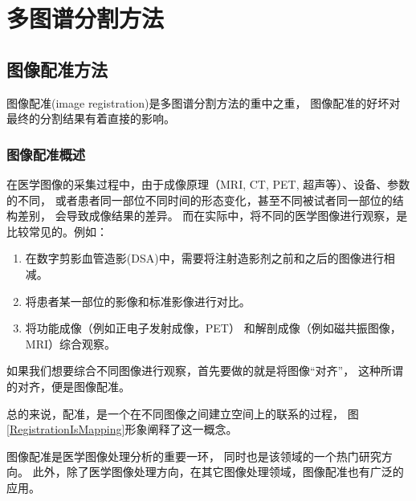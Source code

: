 
\chapter{多图谱分割方法}

\section{图像配准方法}
  图像配准(image registration)是多图谱分割方法的重中之重，
  图像配准的好坏对最终的分割结果有着直接的影响。
\subsection{图像配准概述}
在医学图像的采集过程中，由于成像原理（MRI, CT, PET, 超声等）、设备、参数的不同，
或者患者同一部位不同时间的形态变化，甚至不同被试者同一部位的结构差别，
会导致成像结果的差异。
而在实际中，将不同的医学图像进行观察，是比较常见的。例如：
\begin{enumerate}
  \item 在数字剪影血管造影(DSA)中，需要将注射造影剂之前和之后的图像进行相减。
  \item 将患者某一部位的影像和标准影像进行对比。
  \item 将功能成像（例如正电子发射成像，PET）%
    和解剖成像（例如磁共振图像，MRI）综合观察。
\end{enumerate}
如果我们想要综合不同图像进行观察，首先要做的就是将图像``对齐''，
这种所谓的对齐，便是图像配准。

总的来说，配准，是一个在不同图像之间建立空间上的联系的过程，
图\ref{RegistrationIsMapping}形象阐释了这一概念。

图像配准是医学图像处理分析的重要一环，
同时也是该领域的一个热门研究方向。
此外，除了医学图像处理方向，在其它图像处理领域，图像配准也有广泛的应用。

